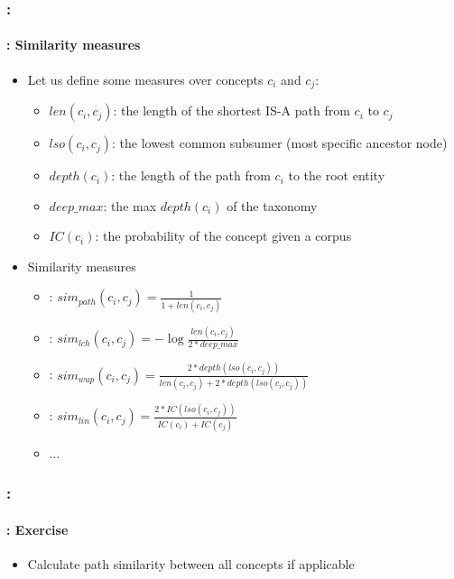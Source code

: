 \documentclass[xcolor=table]{beamer}
\begin{document}
\begin{frame}
	\frametitle{\insertshortsubtitle: \insertsection}
	\framesubtitle{\insertsubsection: Similarity measures}
	
	\begin{itemize}
		\item Let us define some measures over concepts $c_i$ and $c_j$:
		\begin{itemize}
			\item $len(c_i, c_j)$: the length of the shortest IS-A path from $c_i$ to $c_j$
			\item $lso(c_i, c_j)$: the lowest common subsumer (most specific ancestor node)
			\item $depth(c_i)$: the length of the path from $c_i$ to the root entity
			\item $deep\_max$: the max $depth(c_i)$ of the taxonomy
			\item $IC(c_i)$: the probability of the concept given a corpus
		\end{itemize}
		\item Similarity measures
		\begin{itemize}
			\item {}: $sim_{path}(c_i, c_j) = \frac{1}{1+len(c_i, c_j)}$
			\item {}: $sim_{lch}(c_i, c_j) = -\log\frac{len(c_i, c_j)}{2*deep\_max}$
			\item {}: $sim_{wup}(c_i, c_j) = \frac{2*depth(lso(c_i, c_j))}{len(c_i, c_j)+2*depth(lso(c_i, c_j))}$
			\item {}: $sim_{lin}(c_i, c_j) = \frac{2*IC(lso(c_i, c_j))}{IC(c_i)+IC(c_j)}$ 
			\item ...
		\end{itemize}
	\end{itemize}
	
\end{frame}

\begin{frame}
	\frametitle{\insertshortsubtitle: \insertsection}
	\framesubtitle{\insertsubsection: Exercise}
	
	
	\begin{itemize}
		\item Calculate path similarity between all concepts if applicable
	\end{itemize}
	
\end{frame}
\end{document}
